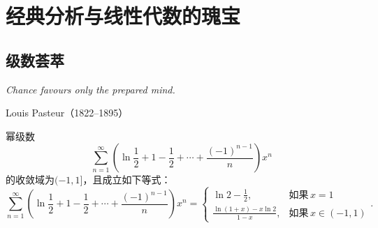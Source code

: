 \appendix
\chapter{经典分析与线性代数的瑰宝}
\section{级数荟萃}
\begin{proverb}
  { \itshape
   \hfill Chance favours only the prepared mind.
  }

\hfill Louis Pasteur（1822–1895）
\end{proverb}

\begin{mybox}
  \begin{lemma}

  幂级数
  \[
    \sum_{n=1}^\infty \left( \ln\frac12 + 1 - \frac12 + \cdots + \frac{(-1)^{n-1}}n \right) x^n
  \]
  的收敛域为$(-1,1]$，且成立如下等式：
    \[
      \sum_{n=1}^\infty \left( \ln\frac12 + 1 - \frac12 + \cdots + \frac{(-1)^{n-1}}n \right)x^n =
      \begin{cases}
        \ln2 - \frac12, & \text{如果}\, x = 1 \\
        \frac{\ln(1+x)-x\ln2}{1-x}, & \text{如果}\, x\in(-1,1)
      \end{cases}.
    \]
  \end{lemma}
\end{mybox}

